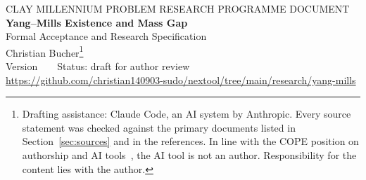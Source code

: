 \documentclass[11pt,a4paper]{article}
\begin{document}
\begin{center}
{\sffamily\small CLAY MILLENNIUM PROBLEM \textperiodcentered{} RESEARCH PROGRAMME DOCUMENT}\\[10pt]
{\LARGE\bfseries Yang--Mills Existence and Mass Gap}\\[5pt]
{\Large Formal Acceptance and Research Specification}\\[12pt]
{\large Christian Bucher}\footnote{Drafting assistance: Claude Code, an AI system by Anthropic. Every source statement was checked against the primary documents listed in Section~\ref{sec:sources} and in the references. In line with the COPE position on authorship and AI tools~\cite{COPE23}, the AI tool is not an author. Responsibility for the content lies with the author.}\\[4pt]
{\small Version \LedgerVersion\ \textperiodcentered{} \LedgerDate\ \textperiodcentered{} Status: draft for author review}\\[2pt]
{\small\url{https://github.com/christian140903-sudo/nextool/tree/main/research/yang-mills}}
\end{center}

\begin{abstract}
\noindent This document fixes, in verifiable form, what a resolution of the Clay Millennium Problem \enquote{Yang--Mills Existence and Mass Gap} must establish. It also sets out a two-track research programme to pursue one: a constructive track (existence and mass gap) and a foundational-audit track (a rigorous counterexample or a proof of ill-posedness). The official problem description~\cite{JW} and the Millennium Prize rules~\cite{CMIrules} are frozen by SHA-256 fingerprint. From them we derive an acceptance contract of \NumRequirements{} requirements, an interpretation register of \NumInterpretations{} points where the official text is not formally specific, an assumption ledger of \NumAssumptions{} classified premises and a map of \NumTransitions{} separate transition theorems. A build script validates all of this and computes the closure status of every transition. \textbf{This document does not contain a solution.} In the present revision \NumClosedTransitions{} of \NumTransitions{} transitions is closed; this matches the literature, and the problem remains open.
\end{abstract}
\end{document}
